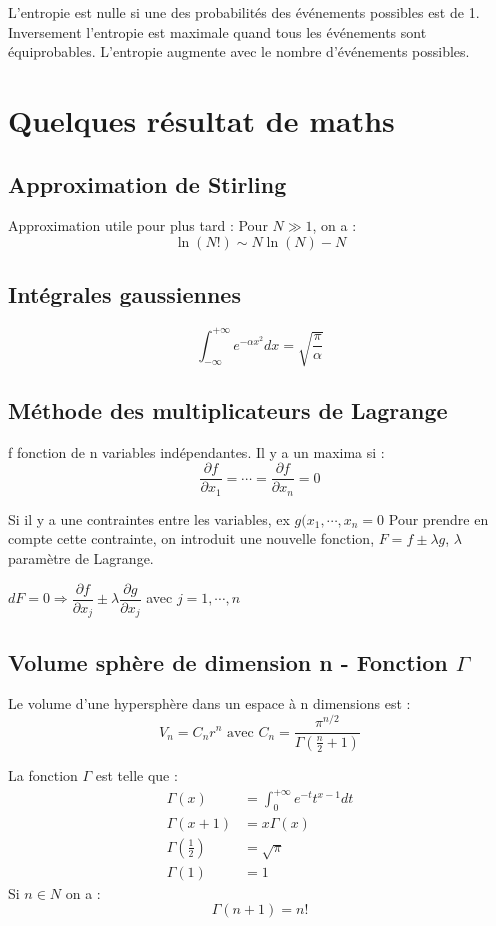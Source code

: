 \documentclass[12pt,a4paper]{report}
\begin{document}
L'entropie est nulle si une des probabilités des événements possibles est de 1. Inversement l'entropie est maximale quand tous les événements sont équiprobables. L'entropie augmente avec le nombre d'événements possibles.

\section{Quelques résultat de maths}

\subsection{Approximation de Stirling}

Approximation utile pour plus tard :
Pour \(N \gg 1\), on a :
\[
	\ln(N!) \sim N \ln(N) - N
\]

\subsection{Intégrales gaussiennes}

\[
	\int_{-\infty}^{+\infty} e^{-\alpha x^2}dx = \sqrt{\dfrac{\pi}{\alpha}}
\]

\subsection{Méthode des multiplicateurs de Lagrange}

f fonction de n variables indépendantes. Il y a un maxima si :
\[
	\dfrac{\partial f}{\partial x_1} = \cdots = \dfrac{\partial f}{\partial x_n} = 0
\]

Si il y a une contraintes entre les variables, ex \(g(x_1, \cdots, x_n = 0\)
Pour prendre en compte cette contrainte, on introduit une nouvelle fonction, \(F = f \pm \lambda g\), \(\lambda\) paramètre de Lagrange.

\(dF = 0 \Rightarrow \dfrac{\partial f}{\partial x_j} \pm \lambda \dfrac{\partial g}{\partial x_j}\) avec \(j = 1, \cdots, n\)

\subsection{Volume sphère de dimension n - Fonction \(\Gamma\)}

Le volume d'une hypersphère dans un espace à n dimensions est :
\[
	V_n = C_n r^n \text{ avec } C_n = \dfrac{\pi^{n/2}}{\Gamma\left( \frac{n}{2} + 1 \right)}
\]

La fonction \(\Gamma\) est telle que :
\begin{align*}
	\Gamma(x) &= \int_0^{+\infty} e^{-t} t^{x - 1} dt\\
	\Gamma (x+1) &= x \Gamma(x)\\
	\Gamma (\frac{1}{2}) &= \sqrt{\pi}\\
	\Gamma (1) &= 1	
\end{align*}
Si \(n \in N\) on a :
\[
\Gamma (n + 1) = n!
\]	
\end{document}
